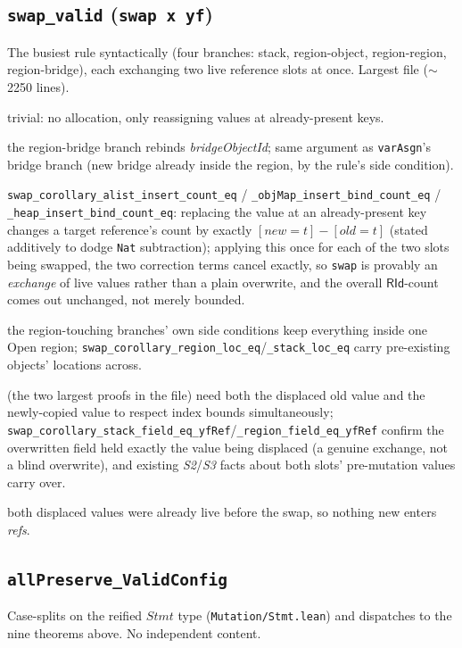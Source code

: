 \documentclass[11pt]{article}
\newcommand{\file}[1]{\texttt{#1}}
\newcommand{\op}[1]{\texttt{#1}}
\newcommand{\thm}[1]{\textbf{\texttt{#1}}}
\begin{document}
\subsection{\thm{swap\_valid} (\op{swap x yf})}
The busiest rule syntactically (four branches: stack, region-object, region-region,
region-bridge), each exchanging two live reference slots at once. Largest file ($\sim$2250 lines).
\begin{description}[nosep]
  \item[L1, L2, S1] trivial: no allocation, only reassigning values at already-present keys.
  \item[H1] the region-bridge branch rebinds \textit{bridgeObjectId}; same argument as
    \op{varAsgn}'s bridge branch (new bridge already inside the region, by the rule's side
    condition).
  \item[H2] \texttt{swap\_corollary\_alist\_insert\_count\_eq} /
    \texttt{\_objMap\_insert\_bind\_count\_eq} / \texttt{\_heap\_insert\_bind\_count\_eq}: replacing
    the value at an already-present key changes a target reference's count by exactly
    $[\mathit{new}{=}t] - [\mathit{old}{=}t]$ (stated additively to dodge \texttt{Nat} subtraction);
    applying this once for each of the two slots being swapped, the two correction terms cancel
    exactly, so \op{swap} is provably an \emph{exchange} of live values rather than a plain
    overwrite, and the overall $\mathsf{RId}$-count comes out unchanged, not merely bounded.
  \item[H3] the region-touching branches' own side conditions keep everything inside one Open
    region; \texttt{swap\_corollary\_region\_loc\_eq}/\texttt{\_stack\_loc\_eq} carry pre-existing
    objects' locations across.
  \item[S2, S3] (the two largest proofs in the file) need both the displaced old value and the
    newly-copied value to respect index bounds simultaneously;
    \texttt{swap\_corollary\_stack\_field\_eq\_yfRef}/\texttt{\_region\_field\_eq\_yfRef} confirm
    the overwritten field held exactly the value being displaced (a genuine exchange, not a blind
    overwrite), and existing \textit{S2}/\textit{S3} facts about both slots' pre-mutation values
    carry over.
  \item[HS1, HS2] both displaced values were already live before the swap, so nothing new enters
    \textit{refs}.
\end{description}

\subsection{\thm{allPreserve\_ValidConfig}}
Case-splits on the reified $Stmt$ type (\file{Mutation/Stmt.lean}) and dispatches to the nine
theorems above. No independent content.
\end{document}
